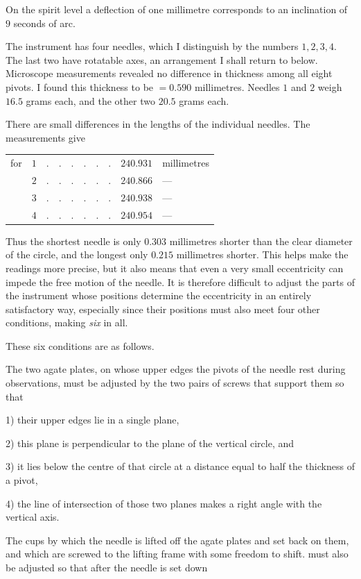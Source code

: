 On the spirit level a deflection of one millimetre corresponds to an inclination of $9$ seconds of arc.

The instrument has four needles, which I distinguish by the numbers $1,2,3,4$. The last two have rotatable axes, an arrangement I shall return to below. Microscope measurements revealed no difference in thickness among all eight pivots. I found this thickness to be $=0.590$ millimetres. Needles $1$ and $2$ weigh $16.5$ grams each, and the other two $20.5$ grams each.

There are small differences in the lengths of the individual needles. The measurements give
\begin{center}
\begin{tabular}{crcrl}
for &$1$&$.\quad.\quad.\quad.\quad.\quad.$&$240.931$&millimetres\\
&$2$&$.\quad.\quad.\quad.\quad.\quad.$&$240.866$&—\\
&$3$&$.\quad.\quad.\quad.\quad.\quad.$&$240.938$&—\\
&$4$&$.\quad.\quad.\quad.\quad.\quad.$&$240.954$&—
\end{tabular}
\end{center}
Thus the shortest needle is only $0.303$ millimetres shorter than the clear diameter of the circle, and the longest only $0.215$ millimetres shorter. This helps make the readings more precise, but it also means that even a very small eccentricity can impede the free motion of the needle. It is therefore difficult to adjust the parts of the instrument whose positions determine the eccentricity in an entirely satisfactory way, especially since their positions must also meet four other conditions, making \textit{six} in all.

These six conditions are as follows.

The two agate plates, on whose upper edges the pivots of the needle rest during observations, must be adjusted by the two pairs of screws that support them so that

1) their upper edges lie in a single plane,

2) this plane is perpendicular to the plane of the vertical circle, and

3) it lies below the centre of that circle at a distance equal to half the thickness of a pivot,

4) the line of intersection of those two planes makes a right angle with the vertical axis.

The cups by which the needle is lifted off the agate plates and set back on them, and which are screwed to the lifting frame with some freedom to shift. must also be adjusted so that after the needle is set down

